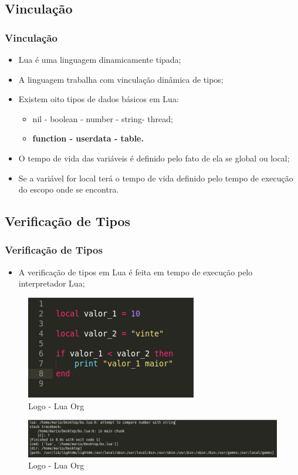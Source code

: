 ﻿\documentclass{beamer}
\begin{document}
\subsection{Vinculação}
\begin{frame}[fragile]
\frametitle{Vinculação}
	\begin{itemize}
	\item<1-> Lua é uma linguagem dinamicamente tipada; 
	\item<2-> A linguagem trabalha com vinculação dinâmica de tipos;
	\item<3-> Existem oito tipos de dados básicos em Lua:
	\begin{itemize}
		\item<4-> nil - boolean - number - string- thread;
		\item<5-> \textbf{function - userdata - table.}
	\end{itemize}
	\item<6-> O tempo de vida das variáveis é definido pelo fato de ela se global ou local;
	\item<7-> Se a variável for local terá o tempo de vida definido pelo tempo de execução do escopo onde se encontra.
	\end{itemize}
\end{frame}

\subsection{Verificação de Tipos}
\begin{frame}[fragile]
\frametitle{Verificação de Tipos}
	\begin{itemize}
	\item A verificação de tipos em Lua é feita em tempo de execução pelo interpretador Lua;
	\end{itemize}
	\begin{figure}[!htb]
			\centering
			\includegraphics[width=0.3\linewidth]{imagens/verificacao_tipo2}
			\caption{Logo - Lua Org}
	\end{figure}

	\begin{figure}[!htb]
			\centering
			\includegraphics[width=1\linewidth]{imagens/verificacao_tipo}
			\caption{Logo - Lua Org}
	\end{figure}
\end{frame}
\end{document}
